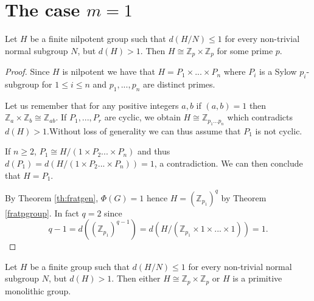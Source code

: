 \section{The case \texorpdfstring{$m=1$}{m=1}}

\begin{theorem}
    \label{nilk1}
    Let $H$ be a finite nilpotent group such that $d(H/N) \le 1$ for every non-trivial normal subgroup $N$, but $d(H) > 1$. Then $H \cong \mathbb{Z}_p \times \mathbb{Z}_p$ for some prime $p$.
\end{theorem}

\begin{proof}
    Since $H$ is nilpotent we have that $H = P_1 \times ... \times P_n$ where $P_i$ is a Sylow $p_i$-subgroup for $1 \le i \le n$ and $p_1,...,p_n$ are distinct primes.
    
    Let us remember that for any positive integers $a, b$ if $(a, b) = 1$ then $\mathbb{Z}_a \times \mathbb{Z}_b \cong \mathbb{Z}_{ab}$. If $P_1,..., P_r$ are cyclic, we obtain $H \cong \mathbb{Z}_{p_1...p_n}$  which contradicts $d(H) > 1$.Without loss of generality we can thus assume that $P_1$ is not cyclic. 
    
    If $n \ge 2$, $P_1 \cong H/(1 \times P_2 ... \times P_n)$ and thus $d(P_1) = d(H/(1 \times P_2 ... \times P_n)) = 1$, a contradiction. We can then conclude that $H = P_1$.

    By Theorem \ref{th:fratgen}, $\Phi(G) = 1$ hence $H = (\mathbb{Z}_{p_1})^q$ by Theorem \ref{fratpgroup}. 
    In fact $q = 2$ since $$q-1 = d((\mathbb{Z}_{p_1})^{q-1}) = d(H/(\mathbb{Z}_{p_1} \times 1 \times ... \times 1)) = 1.$$
\end{proof}

\begin{theorem}
    Let $H$ be a finite group such that $d(H/N) \le 1$ for every non-trivial normal subgroup $N$, but $d(H) > 1$. Then either $H \cong \mathbb{Z}_p \times \mathbb{Z}_p$ or $H$ is a primitive monolithic group.
\end{theorem}

